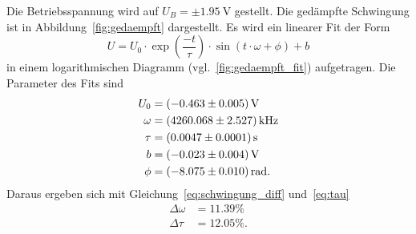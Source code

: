 Die Betriebsspannung wird auf $U_B = \pm \SI{1.95}{\volt}$ gestellt.
Die gedämpfte Schwingung ist in Abbildung~\ref{fig:gedaempft} dargestellt.
Es wird ein linearer Fit der Form
\begin{equation}
U = U_0 \cdot \exp{\left(\frac{-t}{\tau}\right)} \cdot \sin{\left(t \cdot \omega  + \phi\right)} + b
\end{equation}
in einem logarithmischen Diagramm (vgl.~\ref{fig:gedaempft_fit}) aufgetragen.
Die Parameter des Fits sind
\begin{align*}
  U_0 &= \SI{-0.463 \pm 0.005}{\volt} \\
  \omega &= \SI{4260.068 \pm 2.527}{\kilo\hertz} \\
  \tau &= \SI{0.0047 \pm 0.0001}{\second} \\
  b &= \SI{-0.023 \pm 0.004}{\volt} \\
  \phi &= \SI{-8.075 \pm 0.01}{\radian}.
\end{align*}
Daraus ergeben sich mit Gleichung~\eqref{eq:schwingung_diff} und~\eqref{eq:tau}
\begin{align*}
  \Delta \omega &= \num{11.39}\% \\
    \Delta \tau &= \num{12.05}\%.
\end{align*}
